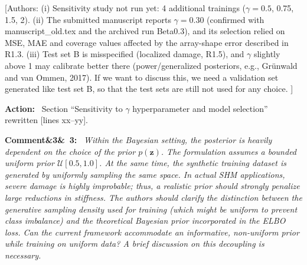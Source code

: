 \documentclass[11pt]{article}
\newenvironment{rcomment}[1]{\par\bigskip\noindent\textbf{Comment\ifx&#1&\else\ #1\fi:}\ \itshape}{\par}
\newenvironment{action}{\par\smallskip\noindent\color{resp}\textbf{Action:}\ }{\par}
\newcommand{\authornote}[1]{\textcolor{note}{\textsf{[Authors: #1]}}}
\newcommand{\tbd}[1]{\textcolor{note}{\textsf{[#1]}}}
\newcommand{\lines}[1]{\tbd{lines #1}}
\newcommand{\z}{\mathbf{z}}
\begin{document}
\authornote{(i) Sensitivity study not run yet: 4 additional trainings ($\gamma=0.5$, 0.75, 1.5, 2). (ii) The submitted
manuscript reports $\gamma=0.30$ (confirmed with manuscript\_old.tex and the archived run Beta0.3), and its selection
relied on MSE, MAE and coverage values affected by the array-shape error described in R1.3. (iii) Test set B is misspecified (localized damage, R1.5), and $\gamma$ slightly above 1 may calibrate better
there (power/generalized posteriors, e.g., Gr\"unwald and van Ommen, 2017). If we want to discuss this, we need a
validation set generated like test set B, so that the test sets are still not used for any choice. }

\begin{action}
Section ``Sensitivity to $\gamma$ hyperparameter and model selection'' rewritten \lines{xx--yy}.
\end{action}

\begin{rcomment}{3}
Within the Bayesian setting, the posterior is heavily dependent on the choice of the prior $p(\z)$. The formulation
assumes a bounded uniform prior $\mathcal{U}[0.5,1.0]$. At the same time, the synthetic training dataset is generated
by uniformly sampling the same space. In actual SHM applications, severe damage is highly improbable; thus, a realistic
prior should strongly penalize large reductions in stiffness. The authors should clarify the distinction between the
generative sampling density used for training (which might be uniform to prevent class imbalance) and the theoretical
Bayesian prior incorporated in the ELBO loss. Can the current framework accommodate an informative, non-uniform prior
while training on uniform data? A brief discussion on this decoupling is necessary.
\end{rcomment}
\end{document}
